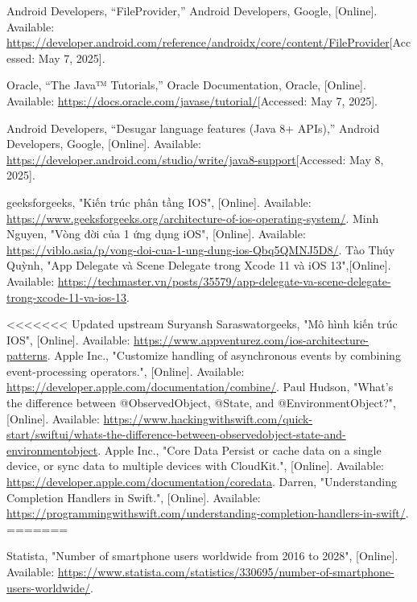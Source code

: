 \documentclass[12pt]{report}
\begin{document}
\begin{thebibliography}{1}
  Android Developers, “FileProvider,” Android Developers, Google, [Online]. Available: \url{https://developer.android.com/reference/androidx/core/content/FileProvider}[Accessed: May 7, 2025].
 
  Oracle, “The Java™ Tutorials,” Oracle Documentation, Oracle, [Online]. Available: \url{https://docs.oracle.com/javase/tutorial/}[Accessed: May 7, 2025].
 
  Android Developers, “Desugar language features (Java 8+ APIs),” Android Developers, Google, [Online]. Available: \url{https://developer.android.com/studio/write/java8-support}[Accessed: May 8, 2025].
 
  
 geeksforgeeks, "Kiến trúc phân tầng IOS", [Online]. Available: \url{https://www.geeksforgeeks.org/architecture-of-ios-operating-system/}.
  Minh Nguyen, "Vòng đời của 1 ứng dụng iOS", [Online]. Available: \url{https://viblo.asia/p/vong-doi-cua-1-ung-dung-ios-Qbq5QMNJ5D8/}.
Tào Thúy Quỳnh, "App Delegate và Scene Delegate trong Xcode 11 và iOS 13",[Online]. Available: \url{https://techmaster.vn/posts/35579/app-delegate-va-scene-delegate-trong-xcode-11-va-ios-13}.

<<<<<<< Updated upstream
Suryansh Saraswatorgeeks, "Mô hình kiến trúc IOS", [Online]. Available: \url{https://www.appventurez.com/ios-architecture-patterns}.
Apple Inc., "Customize handling of asynchronous events by combining event-processing operators.", [Online]. Available: \url{https://developer.apple.com/documentation/combine/}.
 Paul Hudson, "What’s the difference between @ObservedObject, @State, and @EnvironmentObject?", [Online]. Available: \url{https://www.hackingwithswift.com/quick-start/swiftui/whats-the-difference-between-observedobject-state-and-environmentobject}.
 Apple Inc., "Core Data Persist or cache data on a single device, or sync data to multiple devices with CloudKit.", [Online]. Available: \url{https://developer.apple.com/documentation/coredata}.
 Darren, "Understanding Completion Handlers in Swift.", [Online]. Available: \url{https://programmingwithswift.com/understanding-completion-handlers-in-swift/}.
=======

    Statista, "Number of smartphone users worldwide from 2016 to 2028", [Online]. Available: \url{https://www.statista.com/statistics/330695/number-of-smartphone-users-worldwide/}.
    

\end{thebibliography}
\end{document}
